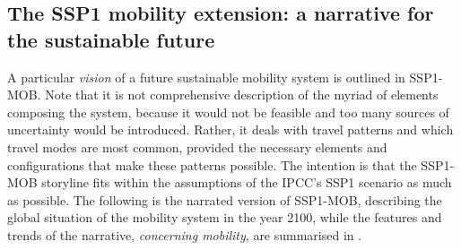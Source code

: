 \subsection[The SSP1 mobility extension]{The SSP1 mobility extension: a narrative for the sustainable future}
\label{ss:results:ssp1-mob-development}
A particular \emph{vision} of a future sustainable mobility system is outlined in SSP1-MOB. Note that it is not comprehensive description of the myriad of elements composing the system, because it would not be feasible and too many sources of uncertainty would be introduced. Rather, it deals with travel patterns and which travel modes are most common, provided the necessary elements and configurations that make these patterns possible. The intention is that the SSP1-MOB storyline fits within the assumptions of the \gls{IPCC}'s SSP1 scenario as much as possible. The following is the narrated version of SSP1-MOB, describing the global situation of the mobility system in the year 2100, while the features and trends of the narrative, \emph{concerning mobility}, are summarised in .
%
